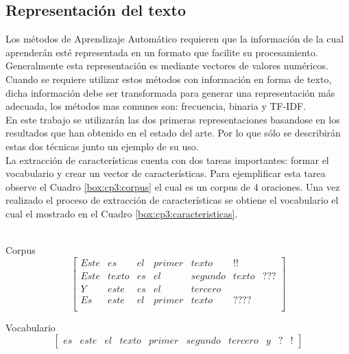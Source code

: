 \subsection[Representación del T]{Representación del texto}

Los métodos de Aprendizaje Automático requieren que la información de la cual aprenderán esté representada en un
formato que facilite su procesamiento. Generalmente esta representación es mediante vectores de valores numéricos. 
Cuando se requiere utilizar estos métodos con información en forma de texto, dicha
información debe ser transformada para generar una representación más adecuada, los métodos mas comunes son: frecuencia, binaria y TF-IDF.\\ 


En este trabajo se utilizarán las dos primeras representaciones basandose en los resultados que han obtenido en el estado del arte. Por lo que sólo se describirán estas dos técnicas junto un ejemplo de su uso.\\


La extracción de características cuenta con dos tareas importantes: formar el vocabulario y crear un vector de características. Para ejemplificar esta tarea observe el Cuadro \ref{box:cp3:corpus} el cual es un corpus de 4 oraciones. Una vez realizado el proceso de extracción de características se obtiene el vocabulario el cual el mostrado en el Cuadro \ref{box:cp3:caracteristicas}.\\\\

\begin{mygraybox}[label={box:cp3:corpus}]{Corpus} 
\begin{equation*}
\begin{bmatrix}
Este&es&el&primer&texto&!!\\
Este&texto&es&el&segundo&texto&???\\
Y&este&es&el&tercero\\
Es&este&el&primer&texto&????\\
\end{bmatrix}
\end{equation*}
\end{mygraybox}

\begin{mygraybox}[label={box:cp3:caracteristicas}]{Vocabulario} 
\begin{equation*}
\begin{bmatrix}
es  & este & el & texto & primer & segundo & tercero & y & ? & !
\end{bmatrix}
\end{equation*}
\end{mygraybox}

